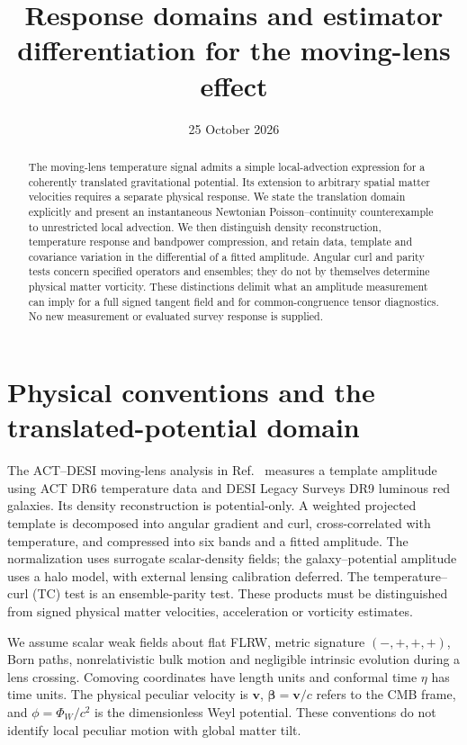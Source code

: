 \documentclass[aps,prd,reprint,onecolumn,notitlepage,nofootinbib]{revtex4-2}
\newcommand{\vect}[1]{\boldsymbol{#1}}
\begin{document}
\title{Response domains and estimator differentiation for the moving-lens effect}
\date{25 October 2026}
\begin{abstract}
The moving-lens temperature signal admits a simple local-advection expression for a coherently translated gravitational potential. Its extension to arbitrary spatial matter velocities requires a separate physical response. We state the translation domain explicitly and present an instantaneous Newtonian Poisson--continuity counterexample to unrestricted local advection. We then distinguish density reconstruction, temperature response and bandpower compression, and retain data, template and covariance variation in the differential of a fitted amplitude. Angular curl and parity tests concern specified operators and ensembles; they do not by themselves determine physical matter vorticity. These distinctions delimit what an amplitude measurement can imply for a full signed tangent field and for common-congruence tensor diagnostics. No new measurement or evaluated survey response is supplied.
\end{abstract}
\maketitle

\section{Physical conventions and the translated-potential domain}

The ACT--DESI moving-lens analysis in Ref.~\cite{actdesi} measures a template amplitude using ACT DR6 temperature data and DESI Legacy Surveys DR9 luminous red galaxies. Its density reconstruction is potential-only. A weighted projected template is decomposed into angular gradient and curl, cross-correlated with temperature, and compressed into six bands and a fitted amplitude. The normalization uses surrogate scalar-density fields; the galaxy--potential amplitude uses a halo model, with external lensing calibration deferred. The temperature--curl (TC) test is an ensemble-parity test. These products must be distinguished from signed physical matter velocities, acceleration or vorticity estimates.

We assume scalar weak fields about flat FLRW, metric signature $(-,+,+,+)$, Born paths, nonrelativistic bulk motion and negligible intrinsic evolution during a lens crossing. Comoving coordinates have length units and conformal time $\eta$ has time units. The physical peculiar velocity is $\vect v$, $\vect\beta=\vect v/c$ refers to the CMB frame, and $\phi=\Phi_W/c^2$ is the dimensionless Weyl potential. These conventions do not identify local peculiar motion with global matter tilt.
\end{document}
